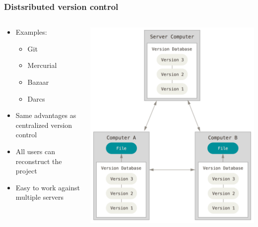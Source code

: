 \begin{frame}
		\frametitle{Distsributed version control}
	\begin{columns}
		\begin{column}{0.5\textwidth}
			\begin{itemize}[<+->]
				\item Examples:
					\begin{itemize}[<+->]
						\item Git
						\item Mercurial
						\item Bazaar
						\item Darcs
					\end{itemize}
				\item Same advantages as centralized version control
				\item All users can reconstruct the project
				\item Easy to work against multiple servers
			\end{itemize}
		\end{column}
		\begin{column}{0.5\textwidth}
			\includegraphics[width=\textwidth]{./pictures/distributed.png}
		\end{column}
	\end{columns}
\end{frame}
